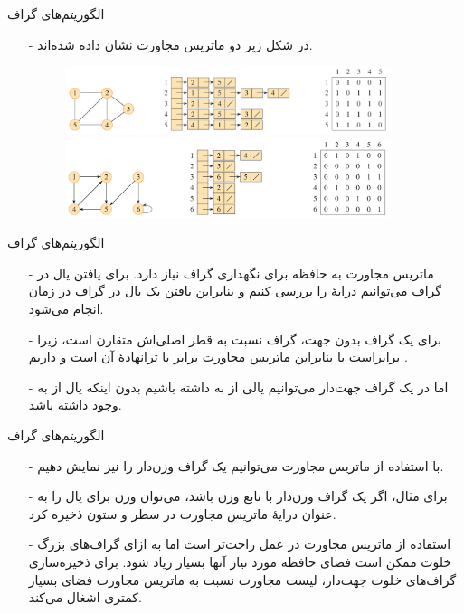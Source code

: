 \begin{frame}{‌الگوریتم‌های گراف}
\begin{itemize}\itemr
\item[-]
در شکل زیر دو ماتریس مجاورت نشان داده شده‌اند.
\begin{figure}
\includegraphics[width=0.9\textwidth]{figs/chap07/550-graph1}
\includegraphics[width=0.9\textwidth]{figs/chap07/550-graph2}
\end{figure}
\end{itemize}
\end{frame}


\begin{frame}{‌الگوریتم‌های گراف}
\begin{itemize}\itemr
\item[-]
ماتریس مجاورت به حافظه
برای نگهداری گراف نیاز دارد. برای یافتن یال
در گراف می‌توانیم درایهٔ
را بررسی کنیم و بنابراین یافتن یک یال در گراف در زمان
انجام می‌شود.
\item[-]
برای یک گراف بدون جهت، گراف نسبت به قطر اصلی‌اش متقارن است، زیرا
برابراست با
بنابراین ماتریس مجاورت برابر با ترانهادهٔ
 آن است و داریم
 .
\item[-]
اما در یک گراف جهت‌دار می‌توانیم یالی از
به
داشته باشیم بدون اینکه یال از
به
وجود داشته باشد.
\end{itemize}
\end{frame}


\begin{frame}{‌الگوریتم‌های گراف}
\begin{itemize}\itemr
\item[-]
با استفاده از ماتریس مجاورت می‌توانیم یک گراف وزن‌دار را نیز نمایش دهیم.
\item[-]
برای مثال، اگر
یک گراف وزن‌دار با تابع وزن
باشد، می‌توان وزن
برای یال
را به عنوان درایهٔ ماتریس مجاورت در سطر
و ستون
ذخیره کرد.
\item[-]
استفاده از ماتریس مجاورت در عمل راحت‌تر است اما به ازای گراف‌های بزرگ خلوت ممکن است فضای حافظه مورد نیاز آنها بسیار زیاد شود.
برای ذخیره‌سازی گراف‌های خلوت جهت‌دار، لیست مجاورت نسبت به ماتریس مجاورت فضای بسیار کمتری اشغال می‌کند.
\end{itemize}
\end{frame}